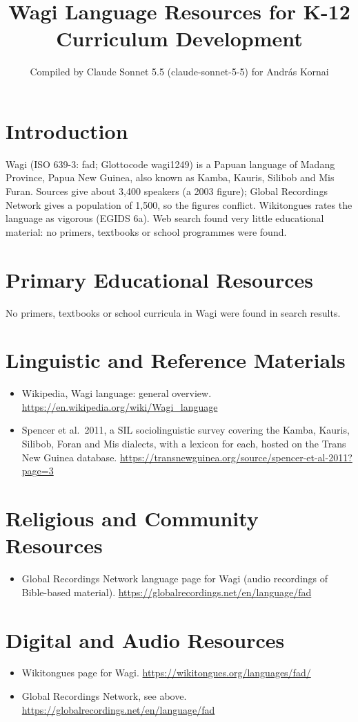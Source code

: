 \documentclass[12pt]{article}
\title{Wagi Language Resources for K-12 Curriculum Development}
\author{Compiled by Claude Sonnet 5.5 (claude-sonnet-5-5) for Andr\'as Kornai}
\date{}
\begin{document}
\maketitle

\section{Introduction}
Wagi (ISO 639-3: fad; Glottocode wagi1249) is a Papuan language of Madang Province, Papua New Guinea, also known as Kamba, Kauris, Silibob and Mis Furan. Sources give about 3,400 speakers (a 2003 figure); Global Recordings Network gives a population of 1,500, so the figures conflict. Wikitongues rates the language as vigorous (EGIDS 6a). Web search found very little educational material: no primers, textbooks or school programmes were found.

\section{Primary Educational Resources}
No primers, textbooks or school curricula in Wagi were found in search results.

\section{Linguistic and Reference Materials}
\begin{itemize}
\item Wikipedia, Wagi language: general overview. \url{https://en.wikipedia.org/wiki/Wagi_language}
\item Spencer et al.\ 2011, a SIL sociolinguistic survey covering the Kamba, Kauris, Silibob, Foran and Mis dialects, with a lexicon for each, hosted on the Trans New Guinea database. \url{https://transnewguinea.org/source/spencer-et-al-2011?page=3}
\end{itemize}

\section{Religious and Community Resources}
\begin{itemize}
\item Global Recordings Network language page for Wagi (audio recordings of Bible-based material). \url{https://globalrecordings.net/en/language/fad}
\end{itemize}

\section{Digital and Audio Resources}
\begin{itemize}
\item Wikitongues page for Wagi. \url{https://wikitongues.org/languages/fad/}
\item Global Recordings Network, see above. \url{https://globalrecordings.net/en/language/fad}
\end{itemize}
\end{document}
